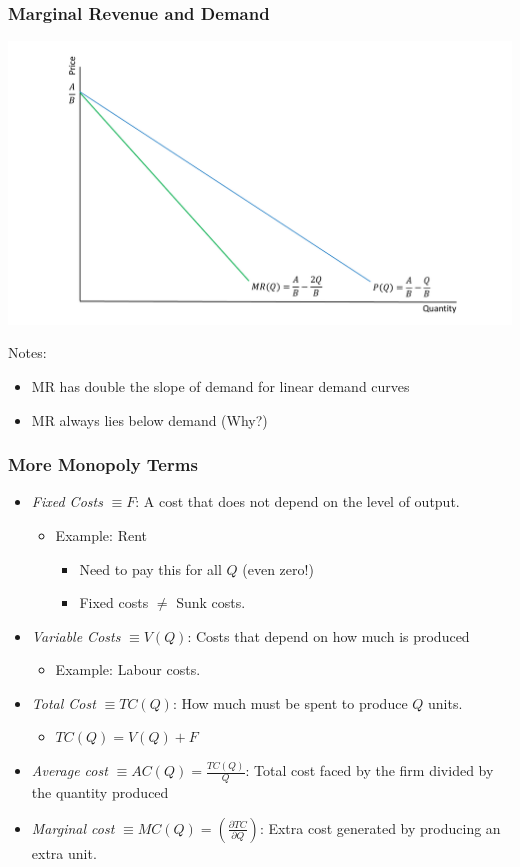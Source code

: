 \documentclass{beamer}
\begin{document}
\begin{frame}
\frametitle{Marginal Revenue and Demand}
		\includegraphics[scale=0.30]{SL2_1.pdf}

Notes:
	\begin{itemize}
		\item MR has double the slope of demand for linear demand curves
		\item MR always lies below demand (Why?)
	\end{itemize}

\end{frame}

\begin{frame}
	\frametitle{More Monopoly Terms}

\begin{itemize}
	\item \emph{Fixed Costs} $\equiv F$: A cost that does not depend on the level of output.
		\begin{itemize}
			\item Example: Rent
				\begin{itemize}
					\item Need to pay this for all $Q$ (even zero!)
					\item Fixed costs $\neq$ Sunk costs. 
				\end{itemize}
		\end{itemize}
	\item \emph{Variable Costs} $\equiv V(Q)$: Costs that depend on how much is produced
		\begin{itemize}
			\item Example: Labour costs.
		\end{itemize} 
	\item \emph{Total Cost} $\equiv TC(Q)$: How much must be spent to produce $Q$ units.
		\begin{itemize}
			\item $TC(Q)=V(Q)+F$
		\end{itemize}
	\item \emph{Average cost} $\equiv AC(Q)=\frac{TC(Q)}{Q}$: Total cost faced by the firm divided by the quantity produced \
	\item \emph{Marginal cost} $\equiv MC(Q)= (\frac{\partial TC}{\partial Q})$: Extra cost generated by producing an extra unit.

\end{itemize}

\end{frame}
\end{document}
